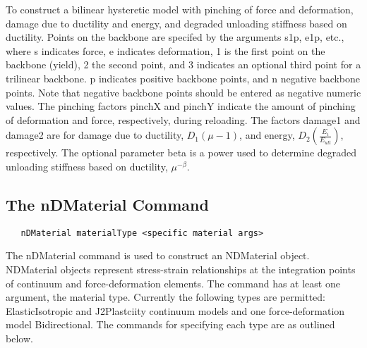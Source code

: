 \documentclass[12pt]{article}
\begin{document}
\noindent To construct a bilinear hysteretic model with pinching of force and
deformation, damage due to ductility and energy, and degraded unloading 
stiffness based on ductility. Points on the backbone are specifed by the
arguments s1p, e1p, etc., where s indicates force, e indicates deformation,
1 is the first point on the backbone (yield), 2 the second point, and 3 indicates
an optional third point for a trilinear backbone. p indicates positive backbone
points, and n negative backbone points. Note that negative backbone points
should be entered as negative numeric values. The pinching factors pinchX and
pinchY indicate the amount of pinching of deformation and force, respectively,
during reloading. The factors damage1 and damage2 are for damage due 
to ductility, $D_1(\mu-1)$, and energy, $D_2(\frac{E_i}{E_{ult}})$, respectively. 
The optional parameter beta is a power used to determine degraded
unloading stiffness based on ductility, $\mu^{-\beta}$.



\subsection{The nDMaterial Command}
{\sf\small
\begin{verbatim}
   nDMaterial materialType <specific material args>
\end{verbatim}
}

The nDMaterial command is used to construct an NDMaterial object. NDMaterial
objects represent stress-strain relationships at the integration points of
continuum and force-deformation elements. The command has at least one
argument, the material type. Currently the following types are
permitted: ElasticIsotropic and J2Plastciity continuum models and one
force-deformation model Bidirectional. The commands for specifying
each type are as outlined below.  
\end{document}
